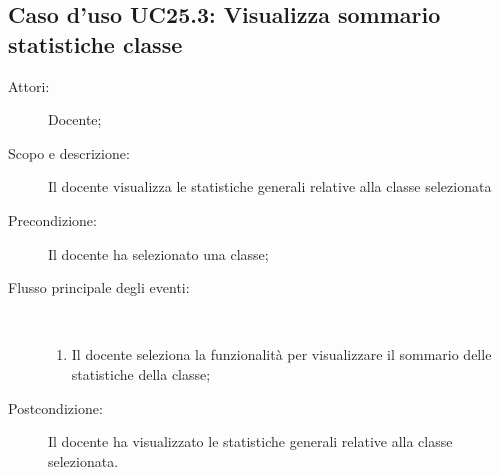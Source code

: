 \subsection{Caso d'uso UC25.3: Visualizza sommario statistiche classe}\begin{description}
\item[Attori:] Docente;
\item[Scopo e descrizione:] Il docente visualizza le statistiche generali relative alla classe selezionata
      \item[Precondizione:] Il docente ha selezionato una classe;

        \item[Flusso principale degli eventi:] \ 
 \begin{enumerate}
          \item Il docente seleziona la funzionalità per visualizzare il sommario delle statistiche della classe;

      \end{enumerate}
    \item[Postcondizione:] Il docente ha visualizzato le statistiche generali relative alla classe selezionata.
  \end{description}
\hypertarget{UC25.4}{}
